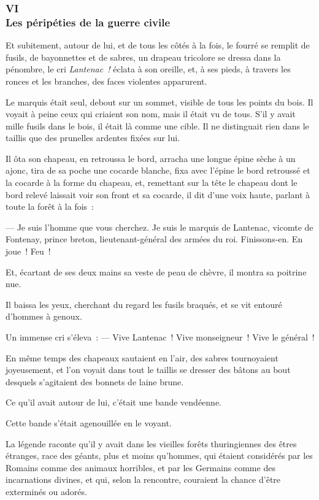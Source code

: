 \documentclass[french,twoside]{book} %
\begin{document}
 \subsubsection[{VI. Les péripéties de la guerre civile}]{VI \\
Les péripéties de la guerre civile}
\label{p1l4c6}
\noindent Et subitement, autour de lui, et de tous les côtés à la fois, le fourré se remplit de fusils, de bayonnettes et de sabres, un drapeau tricolore se dressa dans la pénombre, le cri \emph{Lantenac !} éclata à son oreille, et, à ses pieds, à travers les ronces et les branches, des faces violentes apparurent.\par
Le marquis était seul, debout sur un sommet, visible de tous les points du bois. Il voyait à peine ceux qui criaient son nom, mais il était vu de tous. S’il y avait mille fusils dans le bois, il était là comme une cible. Il ne distinguait rien dans le taillis que des prunelles ardentes fixées sur lui.\par
Il ôta son chapeau, en retroussa le bord, arracha une longue épine sèche à un ajonc, tira de sa poche une cocarde blanche, fixa avec l’épine le bord retroussé et la cocarde à la forme du chapeau, et, remettant sur la tête le chapeau dont le bord relevé laissait voir son front et sa cocarde, il dit d’une voix haute, parlant à toute la forêt à la fois :\par
— Je suis l’homme que vous cherchez. Je suis le marquis de Lantenac, vicomte de Fontenay, prince  breton, lieutenant-général des armées du roi. Finissons-en. En joue ! Feu !\par
Et, écartant de ses deux mains sa veste de peau de chèvre, il montra sa poitrine nue.\par
Il baissa les yeux, cherchant du regard les fusils braqués, et se vit entouré d’hommes à genoux.\par
Un immense cri s’éleva : — Vive Lantenac ! Vive monseigneur ! Vive le général !\par
En même temps des chapeaux sautaient en l’air, des sabres tournoyaient joyeusement, et l’on voyait dans tout le taillis se dresser des bâtons au bout desquels s’agitaient des bonnets de laine brune.\par
Ce qu’il avait autour de lui, c’était une bande vendéenne.\par
Cette bande s’était agenouillée en le voyant.\par
La légende raconte qu’il y avait dans les vieilles forêts thuringiennes des êtres étranges, race des géants, plus et moins qu’hommes, qui étaient considérés par les Romains comme des animaux horribles, et par les Germains comme des incarnations divines, et qui, selon la rencontre, couraient la chance d’être exterminés ou adorés.\par
\end{document}
